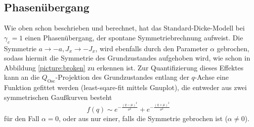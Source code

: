 \subsection{Phasenübergang}
Wie oben schon beschrieben und berechnet, hat das Standard-Dicke-Modell bei $\gamma_c =1$ einen Phasenübergang, der spontane Symmetriebrechnung aufweist.
Die Symmetrie $a\rightarrow -a, J_x\rightarrow -J_x$, wird ebenfalls durch den Parameter $\alpha$ gebrochen, sodass hiermit die Symmetrie des Grundzustandes aufgehoben wird, wie schon in Abbildung \ref{picture:broken} zu erkennen ist.
Zur Quantifizierung dieses Effektes kann an die $Q_\text{Osc}$-Projektion des Grundzustandes entlang der $q$-Achse eine Funktion gefittet werden (least-sqare-fit mittels Gnuplot), die entweder aus zwei symmetrischen Gaußkurven besteht
\begin{equation}
 f(q) \sim e^{-\frac{(q-\mu)^2}{\sigma^2}} + e^{-\frac{(q+\mu)^2}{\sigma^2}}
\end{equation}
für den Fall $\alpha = 0$, oder aus nur einer, falls die Symmetrie gebrochen ist ($\alpha \neq 0$).

